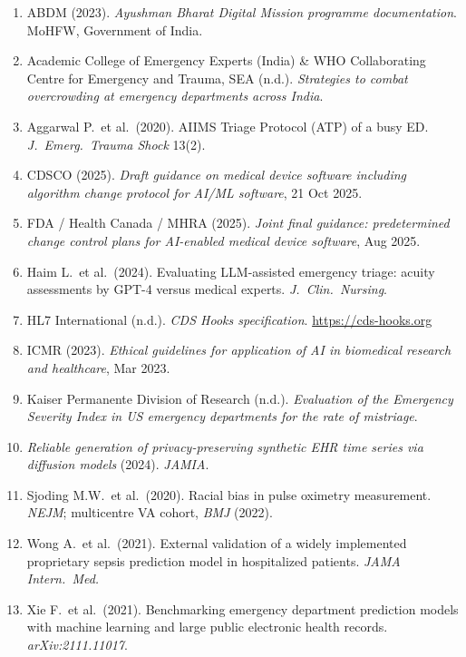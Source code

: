 \documentclass[10pt,a4paper,twocolumn]{article}
\begin{document}
{\scriptsize
\begin{enumerate}[leftmargin=1.3em,itemsep=1.5pt]
\item ABDM (2023). \textit{Ayushman Bharat Digital Mission programme documentation}.
  MoHFW, Government of India.
\item Academic College of Emergency Experts (India) \& WHO Collaborating Centre for
  Emergency and Trauma, SEA (n.d.). \textit{Strategies to combat overcrowding at
  emergency departments across India}.
\item Aggarwal P.\ et al.\ (2020). AIIMS Triage Protocol (ATP) of a busy ED.
  \textit{J.\ Emerg.\ Trauma Shock} 13(2).
\item CDSCO (2025). \textit{Draft guidance on medical device software including
  algorithm change protocol for AI/ML software}, 21 Oct 2025.
\item FDA / Health Canada / MHRA (2025). \textit{Joint final guidance: predetermined
  change control plans for AI-enabled medical device software}, Aug 2025.
\item Haim L.\ et al.\ (2024). Evaluating LLM-assisted emergency triage: acuity
  assessments by GPT-4 versus medical experts. \textit{J.\ Clin.\ Nursing}.
\item HL7 International (n.d.). \textit{CDS Hooks specification}.
  \url{https://cds-hooks.org}
\item ICMR (2023). \textit{Ethical guidelines for application of AI in biomedical
  research and healthcare}, Mar 2023.
\item Kaiser Permanente Division of Research (n.d.). \textit{Evaluation of the
  Emergency Severity Index in US emergency departments for the rate of mistriage}.
\item \textit{Reliable generation of privacy-preserving synthetic EHR time series via
  diffusion models} (2024). \textit{JAMIA}.
\item Sjoding M.W.\ et al.\ (2020). Racial bias in pulse oximetry measurement.
  \textit{NEJM}; multicentre VA cohort, \textit{BMJ} (2022).
\item Wong A.\ et al.\ (2021). External validation of a widely implemented
  proprietary sepsis prediction model in hospitalized patients.
  \textit{JAMA Intern.\ Med.}
\item Xie F.\ et al.\ (2021). Benchmarking emergency department prediction models with
  machine learning and large public electronic health records.
  \textit{arXiv:2111.11017}.
\end{enumerate}
}
\end{document}

